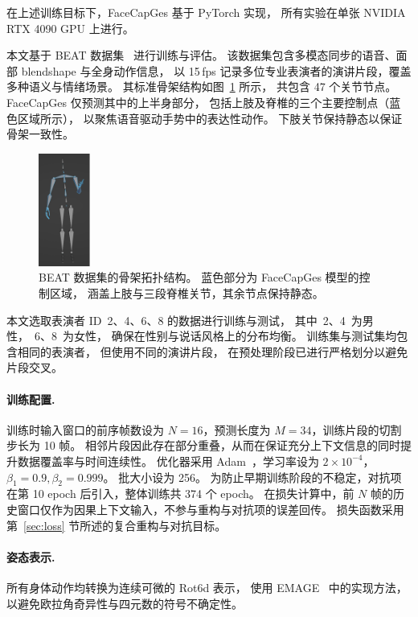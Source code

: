 在上述训练目标下，FaceCapGes 基于 PyTorch 实现，
所有实验在单张 NVIDIA RTX 4090 GPU 上进行。

本文基于 BEAT 数据集~\cite{beatcamn} 进行训练与评估。
该数据集包含多模态同步的语音、面部 blendshape 与全身动作信息，
以 15\,fps 记录多位专业表演者的演讲片段，覆盖多种语义与情绪场景。
其标准骨架结构如图~\ref{fig_beatbones} 所示，
共包含 47 个关节节点。
FaceCapGes 仅预测其中的上半身部分，
包括上肢及脊椎的三个主要控制点（蓝色区域所示），
以聚焦语音驱动手势中的表达性动作。
下肢关节保持静态以保证骨架一致性。

\begin{figure}[h!t]
\centering
\includegraphics[width=0.15\textwidth]{figures/Fig_BEATBones.png}
\caption{
BEAT 数据集的骨架拓扑结构。
蓝色部分为 FaceCapGes 模型的控制区域，
涵盖上肢与三段脊椎关节，其余节点保持静态。
}
\label{fig_beatbones}
\end{figure}

本文选取表演者 ID~2、4、6、8 的数据进行训练与测试，
其中~2、4~为男性，~6、8~为女性，
确保在性别与说话风格上的分布均衡。
训练集与测试集均包含相同的表演者，
但使用不同的演讲片段，
在预处理阶段已进行严格划分以避免片段交叉。

\paragraph{训练配置.}
训练时输入窗口的前序帧数设为 $N=16$，预测长度为 $M=34$，训练片段的切割步长为 10 帧。
相邻片段因此存在部分重叠，从而在保证充分上下文信息的同时提升数据覆盖率与时间连续性。
优化器采用 Adam~\cite{adam2017}，学习率设为 $2\times10^{-4}$，$\beta_1=0.9, \beta_2=0.999$。
批大小设为 256。
为防止早期训练阶段的不稳定，对抗项在第 10 epoch 后引入，整体训练共 374 个 epoch。
在损失计算中，前 $N$ 帧的历史窗口仅作为因果上下文输入，不参与重构与对抗项的误差回传。
损失函数采用第~\ref{sec:loss} 节所述的复合重构与对抗目标。

\paragraph{姿态表示.}
所有身体动作均转换为连续可微的 Rot6d 表示，
使用 EMAGE~\cite{emage} 中的实现方法，
以避免欧拉角奇异性与四元数的符号不确定性。

